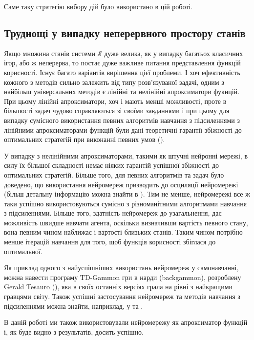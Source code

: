 Саме таку стратегію вибору дій було використано в цій роботі.

\subsection{Труднощі у випадку неперервного простору станів}

Якщо множина станів системи $\mathcal{S}$ дуже велика, як у випадку багатьох класичних ігор, або ж неперерва, то постає дуже важливе питання представлення функцій корисності. Існує багато варіантів вирішення цієї проблеми. І хоч ефективність кожного з методів сильно залежить від типу розв'язуваної задачі, одним з найбільш універсальних методів є лінійні та нелінійні апроксиматори фукнцій. При цьому лінійні апроксиматори, хоч і мають менші можливості, проте в більшості задач чудово справляються зі своїми завданнями і при цьому для випадку сумісного використання певних алгоритмів навчання з підсиленнями з лінійними апроксиматорами функцій були дані теоретичні гарантії збіжності до оптимальних стратегій при виконанні певних умов (\cite{Coulom2002}).

У випадку з нелінійними апроксиматорами, такими як штучні нейронні мережі, в силу їх більшої складності немає ніяких гарантій успішної збіжності до оптимальних стратегій. Більше того, для певних алгоритмів та задач було доведено, що використання нейромереж призводить до осциляції нейромережі (більш детальну інформацію можна знайти в \cite{SuttonBarto2002}). Тим не менше, нейромережі все ж таки успішно використовуються сумісно з різноманітними алгоритмами навчання з підсиленнями. Більше того, здатність нейромереж до узагальнення, дає можливість швидше навчати агента, оскільки визначивши вартість певного стану, вона певним чином наближає і вартості близьких станів. Таким чином потрібно менше ітерацій навчання для того, щоб функція корисності збіглася до оптимальної.

Як приклад одного з найуспішніших використань нейромереж у самонавчанні, можна навести програму TD-Gammon гри в нарди (backgammon), розроблену Gerald Tesauro (\cite{Tesauro1995}), яка в своїх останніх версіях грала на рівні з найкращими гравцями світу. Також успішні застосування нейромереж та методів навчання з підсиленнями можна знайти, наприклад, у \cite{Rummery1995} та \cite{Coulom2002}.

В даній роботі ми також використовували нейромережу як апроксиматор функцій і, як буде видно з результатів, досить успішно.